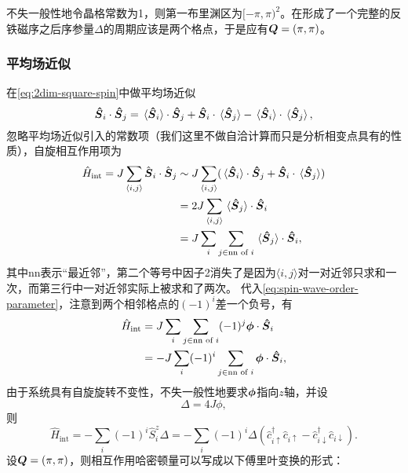 \documentclass[hyperref, UTF8, a4paper]{ctexart}
\newcommand*{\pair}[1]{\langle #1 \rangle}
\begin{document}
不失一般性地令晶格常数为1，则第一布里渊区为$[-\pi, \pi)^2$。在形成了一个完整的反铁磁序之后序参量$\Delta$的周期应该是两个格点，于是应有$\vb*{Q}=(\pi, \pi)$。

\subsubsection{平均场近似}

在\eqref{eq:2dim-square-spin}中做平均场近似
\begin{equation}
    \vb*{\hat{S}}_i \cdot \vb*{\hat{S}}_j = \expval*{\vb*{\hat{S}}_i} \cdot \vb*{\hat{S}}_j + \vb*{\hat{S}}_i \cdot \expval*{\vb*{\hat{S}}_j} - \expval*{\vb*{\hat{S}}_i} \cdot \expval*{\vb*{\hat{S}}_j},
\end{equation}
忽略平均场近似引入的常数项（我们这里不做自洽计算而只是分析相变点具有的性质），自旋相互作用项为
\[
    \begin{aligned}
        \hat{H}_\text{int} = J \sum_{\pair{i, j}} \hat{\vb*{S}}_i \cdot \hat{\vb*{S}}_j &\sim J \sum_{\pair{i, j}} (\expval*{\vb*{\hat{S}}_i} \cdot \vb*{\hat{S}}_j + \vb*{\hat{S}}_i \cdot \expval*{\vb*{\hat{S}}_j}) \\
        &= 2 J \sum_{\pair{i, j}} \expval*{\vb*{\hat{S}}_j} \cdot \vb*{\hat{S}}_i \\
        &= J \sum_i \sum_{j \in \text{nn of } i} \expval*{\vb*{\hat{S}}_j} \cdot \vb*{\hat{S}}_i,
    \end{aligned}
\]
其中nn表示“最近邻”，第二个等号中因子2消失了是因为$\pair{i, j}$对一对近邻只求和一次，而第三行中一对近邻实际上被求和了两次。
代入\eqref{eq:spin-wave-order-parameter}，注意到两个相邻格点的$(-1)^i$差一个负号，有
\[
    \begin{aligned}
        \hat{H}_\text{int} &= J \sum_i \sum_{j \in \text{nn of } i} (-1)^j \vb*{\phi} \cdot \vb*{\hat{S}}_i \\
        &= - J \sum_i (-1)^{i} \sum_{j \in \text{nn of } i} \vb*{\phi} \cdot \vb*{\hat{S}}_i,
    \end{aligned}
\]
由于系统具有自旋旋转不变性，不失一般性地要求$\vb*{\phi}$指向$z$轴，并设
\begin{equation}
    \Delta = 4 J \phi,
\end{equation}
则
\begin{equation}
    \hat{H}_\text{int} = - \sum_i (-1)^i \hat{S}_i^z \Delta = - \sum_i (-1)^i \Delta (\hat{c}_{i\uparrow}^\dagger \hat{c}_{i \uparrow} - \hat{c}_{i \downarrow}^\dagger \hat{c}_{i \downarrow}).
\end{equation}
设$\vb*{Q}=(\pi, \pi)$，则相互作用哈密顿量可以写成以下傅里叶变换的形式： 
\end{document}
